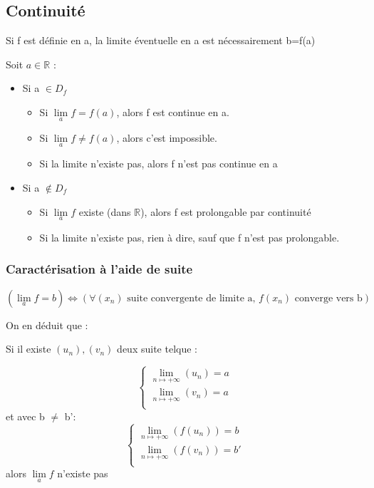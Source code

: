 \subsection{Continuité}
\begin{de}
Si f est définie en a, la limite éventuelle en a est nécessairement b=f(a)
\end{de}
\begin{prop}
Soit $a \in \mathbb{R}$ :\\
\begin{itemize}
 \item Si a $\in D_f$
\begin{itemize}
 \item Si $\underset{a}\lim f = f(a)$, alors f est continue en a.
 \item Si $\underset{a}\lim f \neq f(a)$, alors c'est impossible.
 \item Si la limite n'existe pas, alors f n'est pas continue en a
\end{itemize}
\item Si a $\notin D_f$
\begin{itemize}
 \item Si $\underset{a}\lim f$ existe (dans $\mathbb{R}$), alors f est prolongable par continuité
 \item Si la limite n'existe pas, rien à dire, sauf que f n'est pas prolongable.
\end{itemize}
\end{itemize}
\end{prop}
\subsubsection{Caractérisation à l'aide de suite}
\begin{prop}
$$(\lim_a f = b) \Leftrightarrow (\forall(x_n) \mbox{ suite convergente de limite a, } f(x_n) \mbox{ converge vers b})$$
\end{prop}
On en déduit que : 
\begin{prop}
Si il existe $(u_n),(v_n)$ deux suite telque : 
\end{prop}
$$\left\{\begin{array}{l}
   \underset{n \mapsto +\infty}\lim (u_n) = a\\
   \underset{n \mapsto +\infty}\lim (v_n) = a\\
  \end{array}\right.$$
et avec b $\neq$ b': 
$$\left\{\begin{array}{l}
   \underset{n \mapsto +\infty}\lim (f(u_n)) = b\\
   \underset{n \mapsto +\infty}\lim (f(v_n)) = b'\\
   \end{array}\right.$$
alors $\underset{a}\lim f$ n'existe pas
